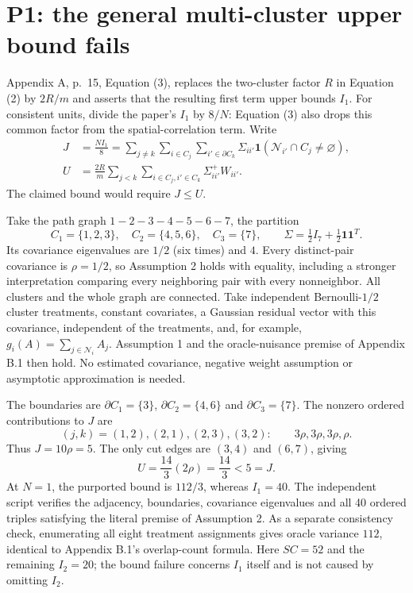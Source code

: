\documentclass[10pt]{article}
\begin{document}
\section*{P1: the general multi-cluster upper bound fails}
Appendix A, p. 15, Equation (3), replaces the two-cluster factor \(R\) in Equation (2) by \(2R/m\) and asserts that the resulting first term upper bounds \(I_1\). For consistent units, divide the paper’s \(I_1\) by \(8/N\): Equation (3) also drops this common factor from the spatial-correlation term. Write \[\begin{aligned}
 J&=\frac{NI_1}{8}=\sum_{j\ne k}\sum_{i\in C_j}\sum_{i'\in\partial C_k}
 \Sigma_{ii'}\mathbf1(\mathcal N_{i'}\cap C_j\ne\varnothing),\\
 U&=\frac{2R}{m}\sum_{j<k}\sum_{i\in C_j,i'\in C_k}\Sigma^+_{ii'}W_{ii'}.\end{aligned}\] The claimed bound would require \(J\le U\).\par
Take the path graph \(1-2-3-4-5-6-7\), the partition \[C_1=\{1,2,3\},\quad C_2=\{4,5,6\},\quad C_3=\{7\},
 \qquad \Sigma=\tfrac12 I_7+\tfrac12\mathbf1\mathbf1^T.\] Its covariance eigenvalues are \(1/2\) (six times) and \(4\). Every distinct-pair covariance is \(\rho=1/2\), so Assumption 2 holds with equality, including a stronger interpretation comparing every neighboring pair with every nonneighbor. All clusters and the whole graph are connected. Take independent Bernoulli-\(1/2\) cluster treatments, constant covariates, a Gaussian residual vector with this covariance, independent of the treatments, and, for example, \(g_i(A)=\sum_{j\in\mathcal N_i}A_j\). Assumption 1 and the oracle-nuisance premise of Appendix B.1 then hold. No estimated covariance, negative weight assumption or asymptotic approximation is needed.\par
The boundaries are \(\partial C_1=\{3\}\), \(\partial C_2=\{4,6\}\) and \(\partial C_3=\{7\}\). The nonzero ordered contributions to \(J\) are \[(j,k)=(1,2),(2,1),(2,3),(3,2):\qquad 3\rho,3\rho,3\rho,\rho.\] Thus \(J=10\rho=5\). The only cut edges are \((3,4)\) and \((6,7)\), giving \[U=\frac{14}{3}(2\rho)=\frac{14}{3}<5=J.\] At \(N=1\), the purported bound is \(112/3\), whereas \(I_1=40\). The independent script verifies the adjacency, boundaries, covariance eigenvalues and all 40 ordered triples satisfying the literal premise of Assumption 2. As a separate consistency check, enumerating all eight treatment assignments gives oracle variance \(112\), identical to Appendix B.1’s overlap-count formula. Here \(SC=52\) and the remaining \(I_2=20\); the bound failure concerns \(I_1\) itself and is not caused by omitting \(I_2\).\par
\end{document}
